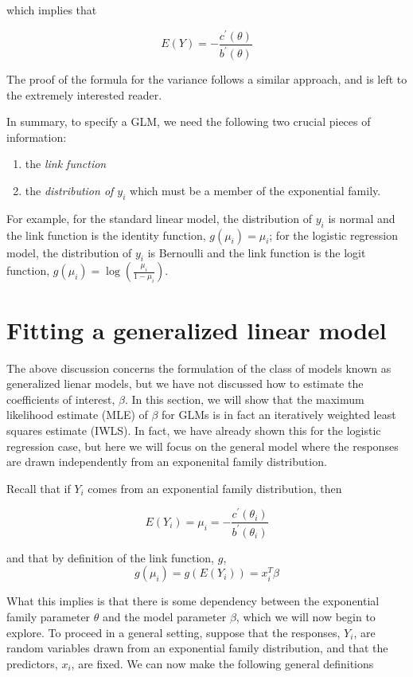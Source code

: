 which implies that

$$E(Y) = - \frac{c^\prime(\theta)}{b^\prime(\theta)}$$

The proof of the formula for the variance follows a similar approach, and is left to the extremely interested reader.

In summary, to specify a GLM, we need the following two crucial pieces of information:

\begin{enumerate}
\item the \textit{link function}
\item the \textit{distribution of $y_i$} which must be a member of the exponential family.
\end{enumerate}


For example, for the standard linear model, the distribution of $y_i$ is normal and the link function is the identity function, $g(\mu_i) = \mu_i$; for the logistic regression model, the distribution of $y_i$ is Bernoulli and the link function is the logit function, $g(\mu_i) = \log \left( \frac{\mu_i}{1 - \mu_i} \right)$.


\section{Fitting a generalized linear model}

The above discussion concerns the formulation of the class of models known as generalized lienar models, but we have not discussed how to estimate the coefficients of interest, $\beta$. In this section, we will show that the maximum likelihood estimate (MLE) of $\beta$ for GLMs is in fact an iteratively weighted least squares estimate (IWLS). In fact, we have already shown this for the logistic regression case, but here we will focus on the general model where the responses are drawn independently from an exponenital family distribution.

Recall that if $Y_i$ comes from an exponential family distribution, then 

$$E(Y_i) = \mu_i = -\frac{c^\prime(\theta_i)}{b^\prime(\theta_i)}$$

and that by definition of the link function, $g$, 
$$g(\mu_i) = g(E(Y_i)) = x_i^T \beta$$

What this implies is that there is some dependency between the exponential family parameter $\theta$ and the model parameter $\beta$, which we will now begin to explore. To proceed in a general setting, suppose that the responses, $Y_i$, are random variables drawn from an exponential family distribution, and that the predictors, $x_i$, are fixed. We can now make the following general definitions

